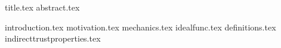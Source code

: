 \documentclass[11pt]{llncs}
\begin{document}
{title.tex}
\thispagestyle{plain}
{abstract.tex}

{introduction.tex}
{motivation.tex}
{mechanics.tex}
{idealfunc.tex}
{definitions.tex}
{indirecttrustproperties.tex}

\end{document}
